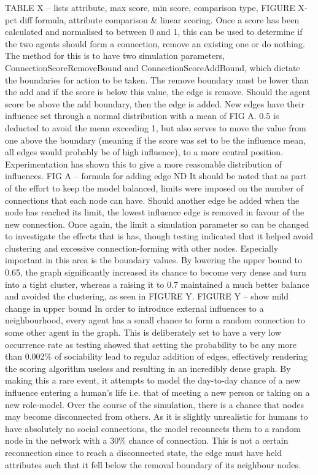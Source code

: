 \documentclass[]{report}
\begin{document}
TABLE X – lists attribute, max score, min score, comparison type, 
FIGURE X- pct diff formula, attribute comparison \& linear scoring.
Once a score has been calculated and normalised to between 0 and 1, this can be used to determine if the two agents should form a connection, remove an existing one or do nothing. The method for this is to have two simulation parameters, ConnectionScoreRemoveBound and ConnectionScoreAddBound, which dictate the boundaries for action to be taken. The remove boundary must be lower than the add and if the score is below this value, the edge is remove. Should the agent score be above the add boundary, then the edge is added. New edges have their influence set through a normal distribution with a mean of FIG A. 0.5 is deducted to avoid the mean exceeding 1, but also serves to move the value from one above the boundary (meaning if the score was set to be the influence mean, all edges would probably be of high influence), to a more central position. Experimentation has shown this to give a more reasonable distribution of influences.
FIG A – formula for adding edge ND 
It should be noted that as part of the effort to keep the model balanced, limits were imposed on the number of connections that each node can have. Should another edge be added when the node has reached its limit, the lowest influence edge is removed in favour of the new connection. Once again, the limit a simulation parameter so can be changed to investigate the effects that is has, though testing indicated that it helped avoid clustering and excessive connection-forming with other nodes. Especially important in this area is the boundary values. By lowering the upper bound to 0.65, the graph significantly increased its chance to become very dense and turn into a tight cluster, whereas a raising it to 0.7 maintained a much better balance and avoided the clustering, as seen in FIGURE Y. 
FIGURE Y – show mild change in upper bound
In order to introduce external influences to a neighbourhood, every agent has a small chance to form a random connection to some other agent in the graph. This is deliberately set to have a very low occurrence rate as testing showed that setting the probability to be any more than 0.002\% of sociability lead to regular addition of edges, effectively rendering the scoring algorithm useless and resulting in an incredibly dense graph. By making this a rare event, it attempts to model the day-to-day chance of a new influence entering a human's life i.e. that of meeting a new person or taking on a new role-model. Over the course of the simulation, there is a chance that nodes may become disconnected from others. As it is slightly unrealistic for humans to have absolutely no social connections, the model reconnects them to a random node in the network with a 30\% chance of connection. This is not a certain reconnection since to reach a disconnected state, the edge must have held attributes such that it fell below the removal boundary of its neighbour nodes.
\end{document}
